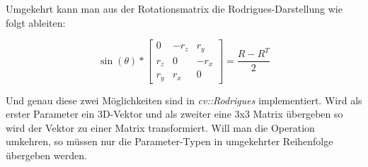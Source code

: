 Umgekehrt kann man aus der Rotationsmatrix die Rodrigues-Darstellung wie folgt ableiten:

\begin{equation}
\sin(\theta) * 
\begin{bmatrix}
0 & -r_z & r_y \\
r_z & 0 & -r_x \\
r_y & r_x & 0
\end{bmatrix}
= 
\frac{R - R^T}{2}
\end{equation}

Und genau diese zwei Möglichkeiten sind in \textit{cv::Rodrigues} implementiert. Wird als erster Parameter ein 3D-Vektor und als zweiter eine 3x3 Matrix übergeben so wird der Vektor zu einer Matrix transformiert. Will man die Operation umkehren, so müssen nur die Parameter-Typen in umgekehrter Reihenfolge übergeben werden.
